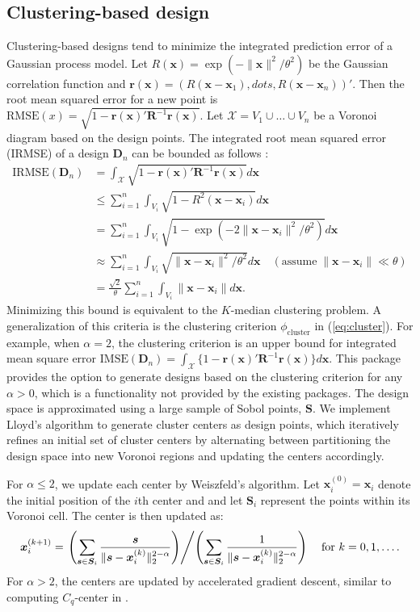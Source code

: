 \subsection{Clustering-based design}
Clustering-based designs tend to minimize the integrated prediction error of a Gaussian process model. Let $R(\bm{x})=\exp\left(-\|\bm x\|^2/\theta^2\right)$ be the Gaussian correlation function and $\bm{r}(\bm{x}) = (R(\bm{x}-\bm{x}_1),dots,R(\bm{x}-\bm{x}_n))'$. Then the root mean squared error for a new point is $\text{RMSE}(x) = \sqrt{1-\bm{r}(\bm{x})'\bm{R}^{-1}\bm{r}(\bm{x})}$. Let $\mathcal{X}=V_1\cup\dots\cup V_n$ be a Voronoi diagram based on the design points. The integrated root mean squared error (IRMSE) of a design $\bm{D}_n$ can be bounded as follows \citep[Ch. 4]{joseph2025}:
\begin{align*}
    \text{IRMSE}(\bm{D}_n) &= \int_\mathcal{X} \sqrt{1-\bm{r}(\bm{x})'\bm{R}^{-1}\bm{r}(\bm{x})} d\bm{x}\\
    &\leq \sum_{i=1}^n \int_{V_i}\sqrt{1-R^2(\bm{x}-\bm{x}_i)} d\bm{x}\\
    &=\sum_{i=1}^n \int_{V_i}\sqrt{1-\exp(-2\|\bm{x}-\bm{x}_i\|^2/\theta^2)} d\bm{x}\\
    &\approx \sum_{i=1}^n \int_{V_i}\sqrt{\|\bm{x}-\bm{x}_i\|^2/\theta^2} d\bm{x} \quad (\text{assume}\; \|\bm{x}-\bm{x}_i\|\ll\theta)\\
    &= \frac{\sqrt{2}}{\theta} \sum_{i=1}^n \int_{V_i}\|\bm{x}-\bm{x}_i\| d\bm{x}.
\end{align*}
Minimizing this bound is equivalent to the $K$-median clustering problem. A generalization of this criteria is the clustering criterion $\phi_{\text{cluster}}$ in (\ref{eq:cluster}). For example, when $\alpha=2$, the clustering criterion is an upper bound for integrated mean square error $\text{IMSE}(\bm{D}_n) = \int_\mathcal{X} \{1-\bm{r}(\bm{x})'\bm{R}^{-1}\bm{r}(\bm{x})\} d\bm{x}$.
This package provides the option to generate designs based on the clustering criterion for any $\alpha > 0$, which is a functionality not provided by the existing packages. The design space is approximated using a large sample of Sobol points, $\bm{S}$. We implement Lloyd’s algorithm to generate cluster centers as design points, which iteratively refines an initial set of cluster centers by alternating between partitioning the design space into new Voronoi regions and updating the centers accordingly.

For $\alpha \leq 2$, we update each center by Weiszfeld's algorithm. Let $\bm{x}^{(0)}_i=\bm{x}_i$ denote the initial position of the $i$th center and and let $\bm{S}_i$ represent the points within its Voronoi cell. The center is then updated as:
\begin{equation*}
    \bm{x}^{(k+1)}_i = \left.\left(\sum_{\bm{s}\in\bm{S}_i}\frac{\bm{s}}{\|\bm{s}-\bm{x}^{(k)}_i\|_2^{2-\alpha}}\right)\middle/ \left(\sum_{\bm{s}\in\bm{S}_i}\frac{1}{\|\bm{s}-\bm{x}^{(k)}_i\|_2^{2-\alpha}}\right)\right. \quad \text{for } k=0, 1, \dots.
\end{equation*}
For $\alpha > 2$, the centers are updated by accelerated gradient descent, similar to computing $C_q$-center in \cite{mak2018minimax}.


